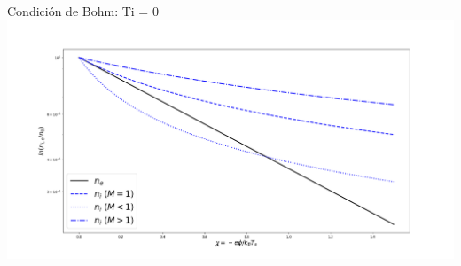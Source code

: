 \documentclass[11pt]{beamer}
\begin{document}
        \begin{frame}[t]{Condici\'on de Bohm: Ti = 0}
            \includegraphics[scale=0.195]{dens4.jpg}
        \end{frame}
            
        
            
\end{document}

